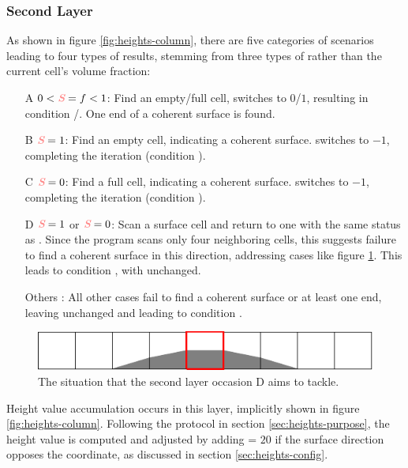 \subsubsection{Second Layer}
As shown in figure \ref{fig:heights-column}, there are five categories of scenarios leading to four types of results, stemming from three types of  rather than the current cell’s volume fraction:
\begin{itemize}
    \item[A] $0<\para{S}=f<1$: Find an empty/full cell,  switches to $0$/$1$, resulting in condition /. One end of a coherent surface is found.
    \item[B] $\para{S}=1$: Find an empty cell, indicating a coherent surface.  switches to $-1$, completing the iteration (condition ).
    \item[C] $\para{S}=0$: Find a full cell, indicating a coherent surface.  switches to $-1$, completing the iteration (condition ).
    \item[D] $\para{S}=1$ or $\para{S}=0$: Scan a surface cell and return to one with the same status as . Since the program scans only four neighboring cells, this suggests failure to find a coherent surface in this direction, addressing cases like figure \ref{fig:heights-Dtarget}. This leads to condition , with  unchanged.
    \item[Others]: All other cases fail to find a coherent surface or at least one end, leaving  unchanged and leading to condition .
\end{itemize}

\begin{figure}
    \centering
    \includegraphics{./image/heights-h/Dtarget}
    \caption{The situation that the second layer occasion D aims to tackle.}
    \label{fig:heights-Dtarget}
\end{figure}

Height value accumulation occurs in this layer, implicitly shown in figure \ref{fig:heights-column}. Following the protocol in section \ref{sec:heights-purpose}, the height value is computed and adjusted by adding  = $20$ if the surface direction opposes the coordinate, as discussed in section \ref{sec:heights-config}.

